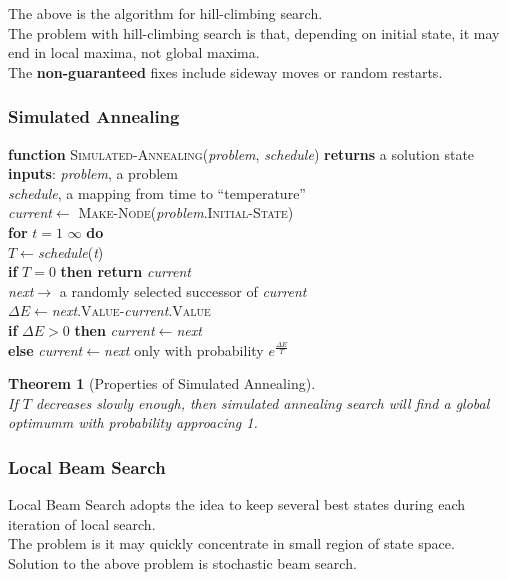 \documentclass[12pt]{article}
\newcommand{\ind}{\hspace*{15pt}}
\newtheorem{theorem}{Theorem}[section]
\theoremstyle{definition}
\begin{document}
The above is the algorithm for hill-climbing search. \\
The problem with hill-climbing search is that, depending on initial state, it may end in local maxima, not global maxima.\\
The \textbf{non-guaranteed} fixes include sideway moves or random restarts.
\subsubsection{Simulated Annealing}
\textbf{function} \textsc{Simulated-Annealing}(\textit{problem}, \textit{schedule}) \textbf{returns} a solution state\\
\ind \textbf{inputs}: \textit{problem}, a problem\\
\ind \ind \ind \ind \textit{schedule}, a mapping from time to ``temperature''\\
\ind \textit{current}$\leftarrow$ \textsc{Make-Node}(\textit{problem}.\textsc{Initial-State})\\
\ind \textbf{for} $t=1$  $\infty$ \textbf{do}\\
\ind \ind $T\leftarrow$\textit{schedule}(\textit{t})\\
\ind \ind \textbf{if} $T=0$ \textbf{then return} \textit{current}\\
\ind \ind \textit{next}$\rightarrow$ a randomly selected successor of \textit{current}\\
\ind \ind $\Delta E\leftarrow$\textit{next}.\textsc{Value}-\textit{current}.\textsc{Value}\\
\ind \ind \textbf{if} $\Delta E>0$ \textbf{then} \textit{current}$\leftarrow$\textit{next}\\
\ind \ind \textbf{else} \textit{current}$\leftarrow$\textit{next} only with probability $e^{\frac{\Delta E}{T}}$
\begin{theorem}[Properties of Simulated Annealing]
\hfill\\\normalfont If $T$ decreases slowly enough, then simulated annealing search will find a global optimumm with probability approacing 1.
\end{theorem}
\subsubsection{Local Beam Search}
Local Beam Search adopts the idea to keep several best states during each iteration of local search. \\
The problem is it may quickly concentrate in small region of state space.\\
Solution to the above problem is stochastic beam search.
\end{document}
